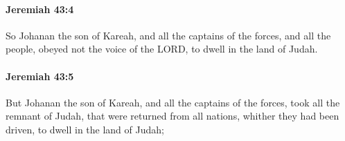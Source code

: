 		\paragraph{Jeremiah 43:4} %
			\label{JEREMIAH-43-4}

			So Johanan the son of Kareah, and all the captains of the forces, and all the people, obeyed not the voice of the LORD, to dwell in the land of Judah.


		\paragraph{Jeremiah 43:5} %
			\label{JEREMIAH-43-5}

			But Johanan the son of Kareah, and all the captains of the forces, took all the remnant of Judah, that were returned from all nations, whither they had been driven, to dwell in the land of Judah;


